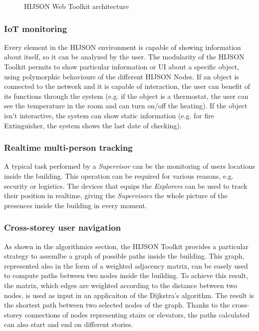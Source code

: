 \begin{figure*}[htb]
\centering
{}
\caption{HIJSON Web Toolkit architecture}
\label{fig:architecture}
\end{figure*}


\subsubsection{IoT monitoring}\label{iot-monitoring}

Every element in the HIJSON environment is capable of showing information
about itself, so it can be analyzed by the user. The modularity of the HIJSON
Toolkit permits to show particular information or UI about a specific object,
using polymorphic behaviours of the different HIJSON Nodes. If an object is
connected to the network and it is capable of interaction, the user can
benefit of its functions through the system (e.g. if the object is a
thermostat, the user can see the temperature in the room and can turn on/off
the heating). If the object isn't interactive, the system can show static
information (e.g. for fire Extinguisher, the system shows the last date of
checking).

\subsubsection{Realtime multi-person tracking}\label{realtime-multi-person-tracking}

A typical task performed by a \emph{Supervisor} can be the monitoring of users
locations inside the building. This operation can be required for various
reasons, e.g. security or logistics. The devices that equips the
\emph{Explorers} can be used to track their position in realtime, giving the
\emph{Supervisors} the whole picture of the presences inside the building in
every moment.

\subsubsection{Cross-storey user navigation}\label{cross-storey-user-navigation}

As shown in the algorithmics section, the HIJSON Toolkit provides a particular
strategy to assemlbe a graph of possible paths inside the building. This
graph, represented also in the form of a weighted adjacency matrix, can be
easely used to compute paths between two nodes inside the building. To
achieve this result, the matrix, which edges are weighted according to the
distance between two nodes, is used as input in an applicaiton of the
Dijkstra's algorithm. The result is the shortest path between two selected
nodes of the graph. Thanks to the cross-storey connections of nodes
representing stairs or elevators, the paths calculated can also start and end
on different stories.



